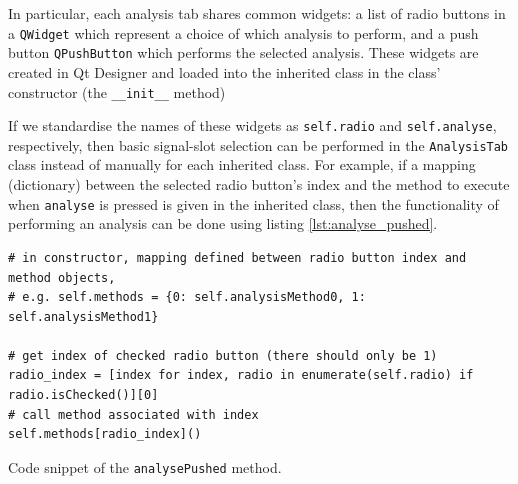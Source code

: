 \documentclass[12pt]{article}
\newenvironment{code}{\captionsetup{type=listing}}{\par\addvspace{\baselineskip}}
\begin{document}
In particular, each analysis tab shares common widgets: a list of radio buttons in a \texttt{QWidget} which represent a choice of which analysis to perform, and a push button \texttt{QPushButton} which performs the selected analysis. These widgets are created in Qt Designer and loaded into the inherited class in the class' constructor (the \texttt{\_\_init\_\_} method)

If we standardise the names of these widgets as \texttt{self.radio} and \texttt{self.analyse}, respectively, then basic signal-slot selection can be performed in the \texttt{AnalysisTab} class instead of manually for each inherited class. For example, if a mapping (dictionary) between the selected radio button's index and the method to execute when \texttt{analyse} is pressed is given in the inherited class, then the functionality of performing an analysis can be done using listing \ref{lst:analyse_pushed}.
\begin{code}\begin{verbatim}
# in constructor, mapping defined between radio button index and method objects,
# e.g. self.methods = {0: self.analysisMethod0, 1: self.analysisMethod1}

# get index of checked radio button (there should only be 1)
radio_index = [index for index, radio in enumerate(self.radio) if radio.isChecked()][0]
# call method associated with index
self.methods[radio_index]()
\end{verbatim}
\caption{Code snippet of the \texttt{analysePushed} method.}
\label{lst:analyse_pushed}
\end{code}
\end{document}
